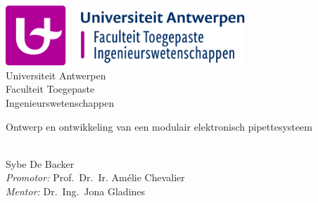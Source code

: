 \documentclass[a4paper,11pt,oneside]{book}
\begin{document}
    
    \frontmatter
    
    \begin{titlepage}      
        \begin{center}
            \includegraphics[width=9cm]{figures/LogoFaculteit.png}\\[0.5cm]
            {\LARGE Universiteit Antwerpen\\[0.5cm]
            Faculteit Toegepaste\\ Ingenieurswetenschappen}\\[2cm]
			
            \linespread{1.2}\huge {
                Ontwerp en ontwikkeling van een modulair elektronisch pipettesysteem
            
            }
            \linespread{1}~\\[2cm]
            {\Large 
                Sybe De Backer
            }\\[1cm] 
            

            {\large 
                \emph{Promotor:} Prof.\ Dr.\ Ir. Amélie Chevalier\\
                \emph{Mentor:} Dr.\ Ing.\ Jona Gladines}\\[1cm] %
            

\end{center}
\end{titlepage}
\end{document}
